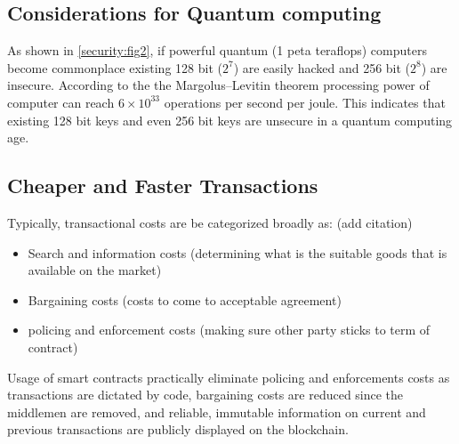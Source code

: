 \documentclass[12pt]{scrreprt}
\begin{document}
 	
 \subsection{Considerations for Quantum computing}
 As shown in \ref*{security:fig2}, if powerful quantum (1 peta teraflops) computers become commonplace existing 128 bit ($2^7$) are easily hacked and 256 bit ($2^8$) are insecure. According to the the Margolus–Levitin theorem processing power of computer can reach $6 \times 10^{33}$ operations per second per joule. This indicates that existing 128 bit keys and even 256 bit keys are unsecure in a quantum computing age. 
 
 
 
 \subsection{Cheaper and Faster Transactions}
 Typically, transactional costs are be categorized broadly as: (add citation)
 
 \begin{itemize}
 \item Search and information costs (determining what is the suitable goods that is available on the market)
 \item Bargaining costs (costs to come to acceptable agreement)
 \item policing and enforcement costs (making sure other party sticks to term of contract)
 \end{itemize} 
 
 Usage of smart contracts practically eliminate policing and enforcements costs as transactions are dictated by code, bargaining costs are reduced since the middlemen are removed, and reliable, immutable information on current and previous transactions are publicly displayed on the blockchain.   
 
\end{document}
